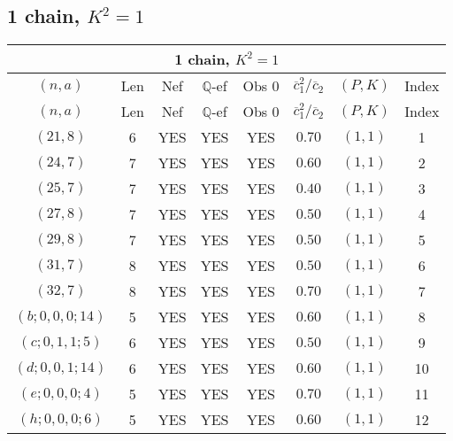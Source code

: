 \subsection{1 chain, $K^2 = 1$}
\begin{longtable}{|c|c|c|c|c|c|c|c|}
\hline
\multicolumn{8}{|c|}{1 chain, $K^2 = 1$}\\
\hline
$(n,a)$ & Len & Nef & $\mathbb Q$-ef & Obs 0 & $\overline c_1^2 / \overline c_2$ & $(P,K)$ & Index\\
\hline
\endfirsthead

\hline
$(n,a)$ & Len & Nef & $\mathbb Q$-ef & Obs 0 & $\overline c_1^2 / \overline c_2$ & $(P,K)$ & Index\\
\hline
\endhead
\hline
\endfoot

$(21,8)$ & 6 & YES & YES & YES & $0.70$ & $(1,1)$ & 1\\
$(24,7)$ & 7 & YES & YES & YES & $0.60$ & $(1,1)$ & 2\\
$(25,7)$ & 7 & YES & YES & YES & $0.40$ & $(1,1)$ & 3\\
$(27,8)$ & 7 & YES & YES & YES & $0.50$ & $(1,1)$ & 4\\
$(29,8)$ & 7 & YES & YES & YES & $0.50$ & $(1,1)$ & 5\\
$(31,7)$ & 8 & YES & YES & YES & $0.50$ & $(1,1)$ & 6\\
$(32,7)$ & 8 & YES & YES & YES & $0.70$ & $(1,1)$ & 7\\
$(b;0,0,0;14)$ & 5 & YES & YES & YES & $0.60$ & $(1,1)$ & 8\\
$(c;0,1,1;5)$ & 6 & YES & YES & YES & $0.50$ & $(1,1)$ & 9\\
$(d;0,0,1;14)$ & 6 & YES & YES & YES & $0.60$ & $(1,1)$ & 10\\
$(e;0,0,0;4)$ & 5 & YES & YES & YES & $0.70$ & $(1,1)$ & 11\\
$(h;0,0,0;6)$ & 5 & YES & YES & YES & $0.60$ & $(1,1)$ & 12
\end{longtable}
